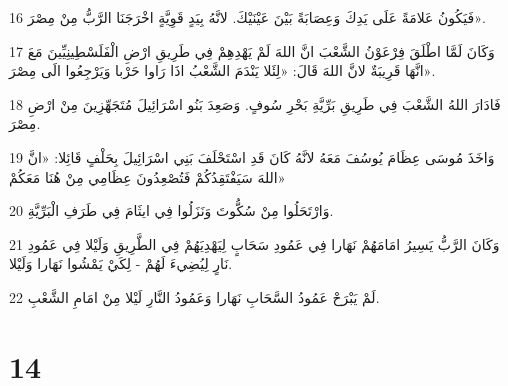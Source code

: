 \par 16 فَيَكُونُ عَلامَةً عَلَى يَدِكَ وَعِصَابَةً بَيْنَ عَيْنَيْكَ. لانَّهُ بِيَدٍ قَوِيَّةٍ اخْرَجَنَا الرَّبُّ مِنْ مِصْرَ».
\par 17 وَكَانَ لَمَّا اطْلَقَ فِرْعَوْنُ الشَّعْبَ انَّ اللهَ لَمْ يَهْدِهِمْ فِي طَرِيقِ ارْضِ الْفَلَسْطِينِيِّينَ مَعَ انَّهَا قَرِيبَةٌ لانَّ اللهَ قَالَ: «لِئَلا يَنْدَمَ الشَّعْبُ اذَا رَاوا حَرْبا وَيَرْجِعُوا الَى مِصْرَ».
\par 18 فَادَارَ اللهُ الشَّعْبَ فِي طَرِيقِ بَرِّيَّةِ بَحْرِ سُوفٍ. وَصَعِدَ بَنُو اسْرَائِيلَ مُتَجَهِّزِينَ مِنْ ارْضِ مِصْرَ.
\par 19 وَاخَذَ مُوسَى عِظَامَ يُوسُفَ مَعَهُ لانَّهُ كَانَ قَدِ اسْتَحْلَفَ بَنِي اسْرَائِيلَ بِحَلْفٍ قَائِلا: «انَّ اللهَ سَيَفْتَقِدُكُمْ فَتُصْعِدُونَ عِظَامِي مِنْ هُنَا مَعَكُمْ»
\par 20 وَارْتَحَلُوا مِنْ سُكُّوتَ وَنَزَلُوا فِي ايثَامَ فِي طَرَفِ الْبَرِّيَّةِ.
\par 21 وَكَانَ الرَّبُّ يَسِيرُ امَامَهُمْ نَهَارا فِي عَمُودِ سَحَابٍ لِيَهْدِيَهُمْ فِي الطَّرِيقِ وَلَيْلا فِي عَمُودِ نَارٍ لِيُضِيءَ لَهُمْ - لِكَيْ يَمْشُوا نَهَارا وَلَيْلا.
\par 22 لَمْ يَبْرَحْ عَمُودُ السَّحَابِ نَهَارا وَعَمُودُ النَّارِ لَيْلا مِنْ امَامِ الشَّعْبِ.

\chapter{14}


